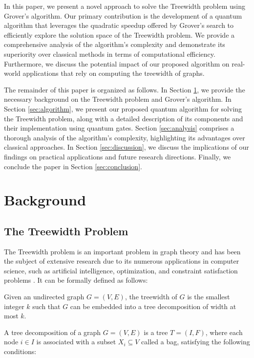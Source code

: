 In this paper, we present a novel approach to solve the Treewidth problem using Grover's algorithm. Our primary contribution is the development of a quantum algorithm that leverages the quadratic speedup offered by Grover's search to efficiently explore the solution space of the Treewidth problem. We provide a comprehensive analysis of the algorithm's complexity and demonstrate its superiority over classical methods in terms of computational efficiency. Furthermore, we discuss the potential impact of our proposed algorithm on real-world applications that rely on computing the treewidth of graphs.

The remainder of this paper is organized as follows. In Section \ref{sec:background}, we provide the necessary background on the Treewidth problem and Grover's algorithm. In Section \ref{sec:algorithm}, we present our proposed quantum algorithm for solving the Treewidth problem, along with a detailed description of its components and their implementation using quantum gates. Section \ref{sec:analysis} comprises a thorough analysis of the algorithm's complexity, highlighting its advantages over classical approaches. In Section \ref{sec:discussion}, we discuss the implications of our findings on practical applications and future research directions. Finally, we conclude the paper in Section \ref{sec:conclusion}.

\section{Background} \label{sec:background}

\subsection{The Treewidth Problem}

The Treewidth problem is an important problem in graph theory and has been the subject of extensive research due to its numerous applications in computer science, such as artificial intelligence, optimization, and constraint satisfaction problems \cite{bodlaender1998a}. It can be formally defined as follows:

\begin{definition}[Treewidth]
Given an undirected graph $G = (V, E)$, the treewidth of $G$ is the smallest integer $k$ such that $G$ can be embedded into a tree decomposition of width at most $k$.
\end{definition}

A tree decomposition of a graph $G = (V, E)$ is a tree $T = (I, F)$, where each node $i \in I$ is associated with a subset $X_i \subseteq V$ called a bag, satisfying the following conditions:

